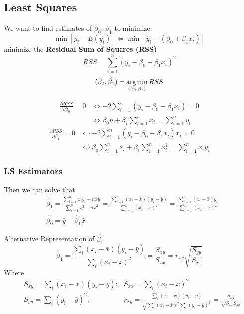 \documentclass[11pt,a4paper]{article}
\newcommand{\argmin}{\operatornamewithlimits{argmin}}
\begin{document}
\subsection{Least Squares}
We want to find estimates of $\beta_0$, $\beta_1$ to minimize:
$$\min [y_i-E(y_i)]\Leftrightarrow \min [y_i-(\beta_0+\beta_1 x_i)]$$
minimize the \textbf{Residual Sum of Squares (RSS)}
$$RSS=\sum_{i=1}^n(y_i-\beta_0-\beta_1 x_i)^2$$
$$(\hat{\beta_0},\hat{\beta_1})=\argmin_{(\beta_0,\beta_1)}RSS$$

$$\begin{aligned}
    \frac{\partial RSS}{\partial \beta_0}=0 &\Leftrightarrow -2\sum_{i=1}^n(y_i-\beta_0-\beta_1 x_i)=0\\
    & \Leftrightarrow \beta_0 n+\beta_1\sum_{i=1}^n x_i=\sum_{i=1}^n y_i
\end{aligned}$$
$$\begin{aligned}
    \frac{\partial RSS}{\partial \beta_1}=0 &\Leftrightarrow -2\sum_{i=1}^n(y_i-\beta_0-\beta_1 x_i)x_i=0\\
    &\Leftrightarrow \beta_0 \sum_{i=1}^nx_i+\beta_1\sum_{i=1}^n x_i^2=\sum_{i=1}^n x_iy_i
\end{aligned}$$

\subsubsection{LS Estimators}
Then we can solve that
$$\begin{aligned}
&\hat{\beta}_{1}=\frac{\sum_{i=1}^{n} x_{i} y_{i}-n \bar{x} \bar{y}}{\sum_{i=1}^{n} x_{i}^{2}-n \bar{x}^{2}}=\frac{\sum_{i=1}^{n}\left(x_{i}-\bar{x}\right)\left(y_{i}-\bar{y}\right)}{\sum_{i=1}^{n}\left(x_{i}-\bar{x}\right)^{2}}=\frac{\sum_{i=1}^{n}\left(x_{i}-\bar{x}\right)y_{i}}{\sum_{i=1}^{n}\left(x_{i}-\bar{x}\right)^{2}} \\
&\hat{\beta}_{0}=\bar{y}-\hat{\beta}_{1} \bar{x}
\end{aligned}$$

Alternative Representation of $\hat{\beta_1}$
$$\hat{\beta}_{1}=\frac{\sum_{i}\left(x_{i}-\bar{x}\right)\left(y_{i}-\bar{y}\right)}{\sum_{i}\left(x_{i}-\bar{x}\right)^{2}}=\frac{S_{x y}}{S_{x x}}=r_{x y} \sqrt{\frac{S_{y y}}{S_{x x}}}$$
Where 
\begin{equation}
    \begin{aligned}
        &S_{xy}=\sum_{i}\left(x_{i}-\bar{x}\right)\left(y_{i}-\bar{y}\right); &S_{xx}=\sum_{i}\left(x_{i}-\bar{x}\right)^{2}\\
        &S_{yy}=\sum_{i}\left(y_{i}-\bar{y}\right)^{2}; &r_{xy}=\frac{\sum_{i}\left(x_{i}-\bar{x}\right)\left(y_{i}-\bar{y}\right)}{\sqrt{\sum_{i}\left(x_{i}-\bar{x}\right)^{2}\sum_{i}\left(y_{i}-\bar{y}\right)^{2}}}=\frac{S_{xy}}{\sqrt{S_{xx}S_{yy}}}
    \end{aligned}
    \nonumber
\end{equation}
\end{document}
